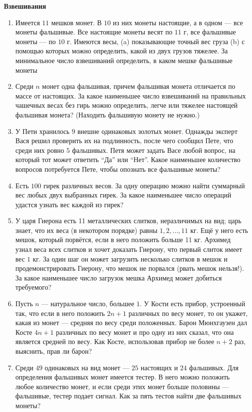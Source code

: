 \documentclass{article}
\begin{document}
\large
	
	
\begin{center}
	\textbf{Взвешивания}
\end{center}

\begin{enumerate}[label*=\protect\fbox{\arabic{enumi}}]

\item Имеется $11$ мешков монет. В $10$ из них монеты настоящие, а в одном
— все монеты фальшивые. Все настоящие монеты весят по $11$ г, все
фальшивые монеты — по $10$ г. Имеются весы, (a) показывающие точный
вес груза (b) с помощью которых можно определить, какой из двух грузов тяжелее. За минимальное число взвешиваний определить, в каком
мешке фальшивые монеты

\item Среди $n$ монет одна фальшивая, причем фальшивая монета отличается по массе от настоящих. За какое наименьшее число взвешиваний на правильных чашечных весах без гирь можно определить, легче или тяжелее настоящей фальшивая монета? (Находить фальшивую монету не нужно.)

\item У Пети хранилось $9$ внешне одинаковых золотых монет. Однажды эксперт Вася решил проверить их на подлинность, после чего сообщил Пете, что среди них ровно $5$ фальшивых. Петя может задать Васе любой вопрос, на который тот может ответить “Да” или “Нет”. Какое наименьшее количество вопросов потребуется Пете, чтобы опознать все фальшивые монеты?

\item Есть $100$ гирек различных весов. За одну операцию можно найти суммарный вес любых двух выбранных гирек. За какое наименьшее число
операций удастся узнать вес каждой из гирек?

\item У царя Гиерона есть 11 металлических слитков, неразличимых на вид; царь знает, что их веса (в некотором порядке) равны $1, 2, \ldots , 11$ кг. Ещё у него есть мешок, который порвётся, если в него положить больше 11 кг. Архимед узнал веса всех слитков и хочет доказать Гиерону, что первый слиток имеет вес $1$ кг. За один шаг он может загрузить несколько слитков в мешок и продемонстрировать Гиерону, что мешок не порвался (рвать мешок нельзя!). За какое наименьшее число загрузок мешка Архимед может добиться требуемого?

\item Пусть $n$ — натуральное число, большее $1$. У Кости есть прибор, устроенный так, что если в него положить $2n+1$ различных по весу монет, то он укажет, какая из монет — средняя по весу среди положенных. Барон Мюнхгаузен дал Косте $4n+1$
различных по весу монет и про одну из них сказал, что она является средней по весу. Как Косте, использовав прибор не более $n+2$ раз, выяснить, прав ли барон?

\item Среди $49$ одинаковых на вид монет — $25$ настоящих и $24$ фальшивых. Для определения фальшивых монет имеется тестер. В него можно положить любое количество монет, и если среди этих монет больше половины — фальшивые, тестер подает сигнал. Как за пять тестов найти две фальшивых монеты? 


\end{enumerate}
\end{document}
